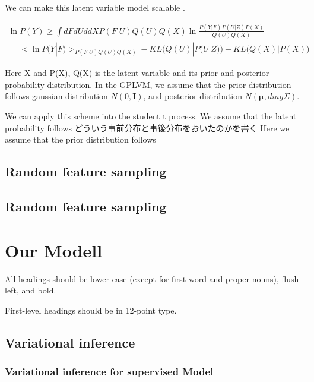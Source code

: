 \documentclass{article}
\begin{document}
We can make this latent variable model scalable .

\begin{eqnarray}
\ln P(Y) \geq \int dFdUddX P(F|U)Q(U)Q(X)\ln \frac{P(Y|F)P(U|Z)P(X)}{Q(U)Q(X)}\\
= \bigl<\ln P(Y|F) \bigr>_{P(F|U)Q(U)Q(X)}-KL\bigl(Q(U)|P(U|Z)\bigr)-KL\bigl(Q(X)|P(X)\bigr)
\end{eqnarray}

Here X and P(X), Q(X) is the latent variable and its prior and posterior probability distribution. In the GPLVM, we assume that the prior distribution  follows gaussian distribution $N(0,\bm{I})$, and posterior distribution $N(\bm{\mu},diag \Sigma)$. 

We can apply this scheme into the student t process. We assume that the latent probability follows  
どういう事前分布と事後分布をおいたのかを書く
Here we assume that the prior distribution follows

\subsection{Random feature sampling}

\subsection{Random feature sampling}

\section{Our Modell}
\label{headings}

All headings should be lower case (except for first word and proper
nouns), flush left, and bold.

First-level headings should be in 12-point type.

\subsection{Variational inference}

\subsubsection{Variational inference for supervised Model}
\end{document}
